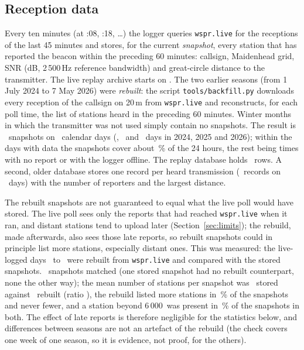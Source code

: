 \documentclass[10pt,a4paper]{article}
\begin{document}
\subsection{Reception data}\label{sec:data}
Every ten minutes (at :08, :18, \dots) the logger queries \texttt{wspr.live} for the receptions of the last 45 minutes and stores, for the current \emph{snapshot}, every station that has reported the beacon within the preceding 60 minutes: callsign, Maidenhead grid, SNR (dB, 2\,500\,Hz reference bandwidth) and great-circle distance to the transmitter. The live replay archive starts on \swFrom. The two earlier seasons (from 1 July 2024 to 7 May 2026) were \emph{rebuilt}: the script \texttt{tools/backfill.py} downloads every reception of the callsign on 20\,m from \texttt{wspr.live} and reconstructs, for each poll time, the list of stations heard in the preceding 60 minutes. Winter months in which the transmitter was not used simply contain no snapshots. The result is \nSnap\ snapshots on \nDays\ calendar days (\yrCACEDays, \yrCACFDays\ and \yrCACGDays\ days in 2024, 2025 and 2026); within the days with data the snapshots cover about \covPct\,\% of the 24 hours, the rest being times with no report or with the logger offline. The replay database holds \nRows\ rows. A second, older database stores one record per heard transmission (\nSpots\ records on \nSpotDays\ days) with the number of reporters and the largest distance.

The rebuilt snapshots are not guaranteed to equal what the live poll would have stored. The live poll sees only the reports that had reached \texttt{wspr.live} when it ran, and distant stations tend to upload later (Section~\ref{sec:limits}); the rebuild, made afterwards, also sees those late reports, so rebuilt snapshots could in principle list more stations, especially distant ones. This was measured: the live-logged days \cmpFrom\ to \cmpTo\ were rebuilt from \texttt{wspr.live} and compared with the stored snapshots. \cmpSnaps\ snapshots matched (one stored snapshot had no rebuilt counterpart, none the other way); the mean number of stations per snapshot was \cmpStored\ stored against \cmpRebuilt\ rebuilt (ratio \cmpRatio), the rebuild listed more stations in \cmpMore\,\% of the snapshots and never fewer, and a station beyond 6\,000\km\ was present in \cmpDxStored\,\% of the snapshots in both. The effect of late reports is therefore negligible for the statistics below, and differences between seasons are not an artefact of the rebuild (the check covers one week of one season, so it is evidence, not proof, for the others).
\end{document}
